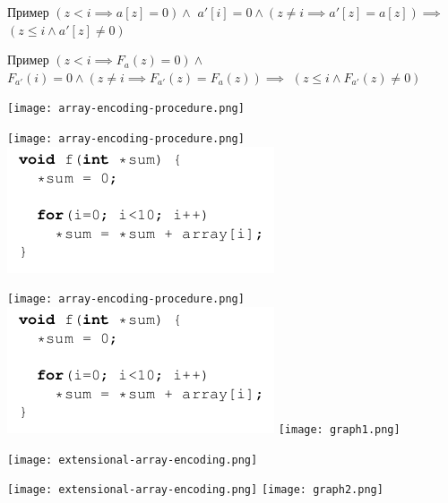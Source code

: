 \documentclass{beamer}
\begin{document}
\begin{frame}{Пример}
$(z < i \implies a[z] = 0) \wedge$\newline
$a'[i] = 0 \wedge (z \ne i \implies a'[z] = a[z])\implies$\newline
$(z \le i \wedge a'[z] \ne 0)$
\end{frame}

\begin{frame}{Пример}
$(z < i \implies F_a(z) = 0) \wedge$\newline
$F_{a'}(i) = 0 \wedge (z \ne i \implies F_{a'}(z) = F_a(z))\implies$\newline
$(z \le i \wedge F_{a'}(z) \ne 0)$
\end{frame}

\begin{frame}{}
\texttt{[image: array-encoding-procedure.png]}
\end{frame}

\begin{frame}{}
\texttt{[image: array-encoding-procedure.png]}
\includegraphics[scale=0.5]{ex1.png}
\end{frame}

\begin{frame}{}
\texttt{[image: array-encoding-procedure.png]}
\includegraphics[scale=0.5]{ex1.png}
\texttt{[image: graph1.png]}
\end{frame}

\begin{frame}{}
\texttt{[image: extensional-array-encoding.png]}
\end{frame}

\begin{frame}{}
\texttt{[image: extensional-array-encoding.png]}
\texttt{[image: graph2.png]}
\end{frame}
\end{document}
